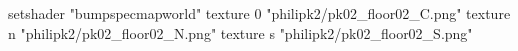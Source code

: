 setshader "bumpspecmapworld"
    texture 0 "philipk2/pk02_floor02_C.png"
    texture n "philipk2/pk02_floor02_N.png"
    texture s "philipk2/pk02_floor02_S.png"